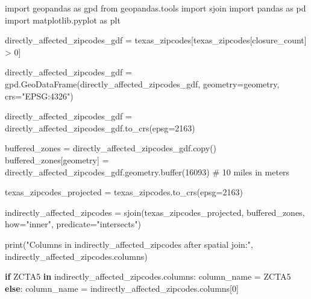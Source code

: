 \documentclass[
  letterpaper,
  DIV=11,
  numbers=noendperiod]{scrartcl}
\newenvironment{Shaded}{\begin{snugshade}}{\end{snugshade}}
\newcommand{\BuiltInTok}[1]{\textcolor[rgb]{0.00,0.23,0.31}{#1}}
\newcommand{\CommentTok}[1]{\textcolor[rgb]{0.37,0.37,0.37}{#1}}
\newcommand{\ControlFlowTok}[1]{\textcolor[rgb]{0.00,0.23,0.31}{\textbf{#1}}}
\newcommand{\DecValTok}[1]{\textcolor[rgb]{0.68,0.00,0.00}{#1}}
\newcommand{\ImportTok}[1]{\textcolor[rgb]{0.00,0.46,0.62}{#1}}
\newcommand{\KeywordTok}[1]{\textcolor[rgb]{0.00,0.23,0.31}{\textbf{#1}}}
\newcommand{\NormalTok}[1]{\textcolor[rgb]{0.00,0.23,0.31}{#1}}
\newcommand{\OperatorTok}[1]{\textcolor[rgb]{0.37,0.37,0.37}{#1}}
\newcommand{\StringTok}[1]{\textcolor[rgb]{0.13,0.47,0.30}{#1}}
\begin{document}
\begin{Shaded}
\begin{Highlighting}[]
\ImportTok{import}\NormalTok{ geopandas }\ImportTok{as}\NormalTok{ gpd}
\ImportTok{from}\NormalTok{ geopandas.tools }\ImportTok{import}\NormalTok{ sjoin}
\ImportTok{import}\NormalTok{ pandas }\ImportTok{as}\NormalTok{ pd}
\ImportTok{import}\NormalTok{ matplotlib.pyplot }\ImportTok{as}\NormalTok{ plt}

\NormalTok{directly\_affected\_zipcodes\_gdf }\OperatorTok{=}\NormalTok{ texas\_zipcodes[texas\_zipcodes[}\StringTok{\textquotesingle{}closure\_count\textquotesingle{}}\NormalTok{] }\OperatorTok{\textgreater{}} \DecValTok{0}\NormalTok{]}

\NormalTok{directly\_affected\_zipcodes\_gdf }\OperatorTok{=}\NormalTok{ gpd.GeoDataFrame(directly\_affected\_zipcodes\_gdf, geometry}\OperatorTok{=}\StringTok{\textquotesingle{}geometry\textquotesingle{}}\NormalTok{, crs}\OperatorTok{=}\StringTok{"EPSG:4326"}\NormalTok{)}

\NormalTok{directly\_affected\_zipcodes\_gdf }\OperatorTok{=}\NormalTok{ directly\_affected\_zipcodes\_gdf.to\_crs(epsg}\OperatorTok{=}\DecValTok{2163}\NormalTok{) }

\NormalTok{buffered\_zones }\OperatorTok{=}\NormalTok{ directly\_affected\_zipcodes\_gdf.copy()}
\NormalTok{buffered\_zones[}\StringTok{\textquotesingle{}geometry\textquotesingle{}}\NormalTok{] }\OperatorTok{=}\NormalTok{ directly\_affected\_zipcodes\_gdf.geometry.}\BuiltInTok{buffer}\NormalTok{(}\DecValTok{16093}\NormalTok{)  }\CommentTok{\# 10 miles in meters}

\NormalTok{texas\_zipcodes\_projected }\OperatorTok{=}\NormalTok{ texas\_zipcodes.to\_crs(epsg}\OperatorTok{=}\DecValTok{2163}\NormalTok{)}

\NormalTok{indirectly\_affected\_zipcodes }\OperatorTok{=}\NormalTok{ sjoin(texas\_zipcodes\_projected, buffered\_zones, how}\OperatorTok{=}\StringTok{"inner"}\NormalTok{, predicate}\OperatorTok{=}\StringTok{"intersects"}\NormalTok{)}

\BuiltInTok{print}\NormalTok{(}\StringTok{"Columns in indirectly\_affected\_zipcodes after spatial join:"}\NormalTok{, indirectly\_affected\_zipcodes.columns)}

\ControlFlowTok{if} \StringTok{\textquotesingle{}ZCTA5\textquotesingle{}} \KeywordTok{in}\NormalTok{ indirectly\_affected\_zipcodes.columns:}
\NormalTok{    column\_name }\OperatorTok{=} \StringTok{\textquotesingle{}ZCTA5\textquotesingle{}}
\ControlFlowTok{else}\NormalTok{:}
\NormalTok{    column\_name }\OperatorTok{=}\NormalTok{ indirectly\_affected\_zipcodes.columns[}\DecValTok{0}\NormalTok{]}



\end{Highlighting}
\end{Shaded}
\end{document}
